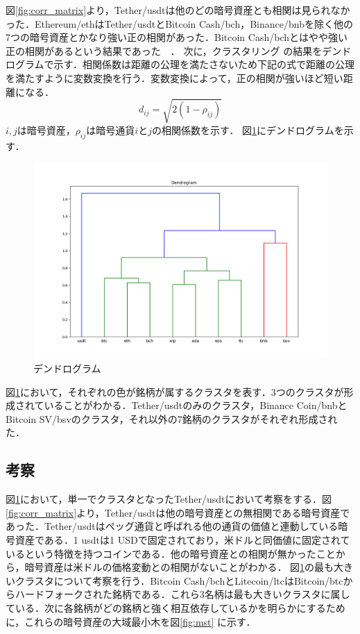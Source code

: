\documentclass{jsarticle}
\begin{document}
	図\ref{fig:corr_matrix}より，Tether/usdtは他のどの暗号資産とも相関は見られなかった．Ethereum/ethはTether/usdtとBitcoin Cash/bch，Binance/bnbを除く他の7つの暗号資産とかなり強い正の相関があった．Bitcoin Cash/bchとはやや強い正の相関があるという結果であった　．
	次に，クラスタリング の結果をデンドログラムで示す．相関係数は距離の公理を満たさないため下記の式で距離の公理を満たすように変数変換を行う．変数変換によって，正の相関が強いほど短い距離になる．
	$$
	d_{ij} = \sqrt{2(1-\rho_{ij})}
	$$
	$i, j$は暗号資産，$\rho_{ij}$は暗号通貨$i$と$j$の相関係数を示す．
	図\ref{fig:dendro}にデンドログラムを示す．
	
	\begin{figure}
		\includegraphics[bb=0.000000 0.000000 864.001728 576.001152, width=\linewidth]{img/2019-01-01_2019-12-31_dendrogram.png}
		\caption{デンドログラム}
		\label{fig:dendro}
	\end{figure}
	
	図\ref{fig:dendro}において，それぞれの色が銘柄が属するクラスタを表す．3つのクラスタが形成されていることがわかる．Tether/usdtのみのクラスタ，Binance Coin/bnbとBitcoin SV/bsvのクラスタ，それ以外の7銘柄のクラスタがそれぞれ形成された．
	\subsection{考察}
	図\ref{fig:dendro}において，単一でクラスタとなったTether/usdtにおいて考察をする．図\ref{fig:corr_matrix}より，Tether/usdtは他の暗号資産との無相関である暗号資産であった．Tether/usdtはペッグ通貨と呼ばれる他の通貨の価値と連動している暗号資産である\cite{tether}．1 usdtは1 USDで固定されており，米ドルと同価値に固定されているという特徴を持つコインである．他の暗号資産との相関が無かったことから，暗号資産は米ドルの価格変動との相関がないことがわかる．
	図\ref{fig:dendro}の最も大きいクラスタについて考察を行う．Bitcoin Cash/bch\cite{bch}とLitecoin/ltc\cite{ltc}はBitcoin/btcからハードフォークされた銘柄である．これら3名柄は最も大きいクラスタに属している．次に各銘柄がどの銘柄と強く相互依存しているかを明らかにするために，これらの暗号資産の大域最小木を図\ref{fig:mst} に示す．
	
\end{document}
